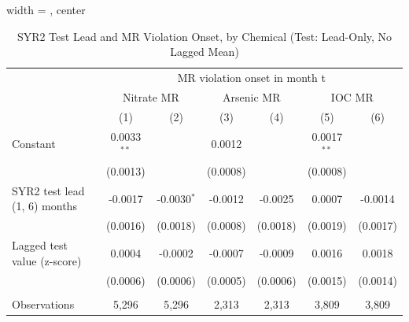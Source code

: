 
\begin{table}[htbp]
   
   \caption{\label{tab:syr2_test_mr_violation_bychem_leadonly_nolagmean_test} SYR2 Test Lead and MR Violation Onset, by Chemical (Test: Lead-Only, No Lagged Mean)}
   \bigskip
   
   \centering
   
   \begin{adjustbox}{width = \textwidth, center}
      
      
      \begin{tabular}{lcccccc}
         \toprule
         
          & \multicolumn{6}{c}{MR violation onset in month t}\\
         
          & \multicolumn{2}{c}{Nitrate MR} & \multicolumn{2}{c}{Arsenic MR} & \multicolumn{2}{c}{IOC MR} \\ 
         
                                                & (1)           & (2)           & (3)      & (4)           & (5)           & (6)\\  
         
         \midrule 
         Constant                               & 0.0033$^{**}$ &               & 0.0012   &               & 0.0017$^{**}$ &   \\   
                                                & (0.0013)      &               & (0.0008) &               & (0.0008)      &   \\   
         SYR2 test lead (1, 6) months           & -0.0017       & -0.0030$^{*}$ & -0.0012  & -0.0025       & 0.0007        & -0.0014\\   
                                                & (0.0016)      & (0.0018)      & (0.0008) & (0.0018)      & (0.0019)      & (0.0017)\\   
         Lagged test value (z-score)            & 0.0004        & -0.0002       & -0.0007  & -0.0009       & 0.0016        & 0.0018\\   
                                                & (0.0006)      & (0.0006)      & (0.0005) & (0.0006)      & (0.0015)      & (0.0014)\\   
         
          \\
         
         Observations                           & 5,296         & 5,296         & 2,313    & 2,313         & 3,809         & 3,809\\  
         

\end{tabular}
\end{adjustbox}
\end{table}
